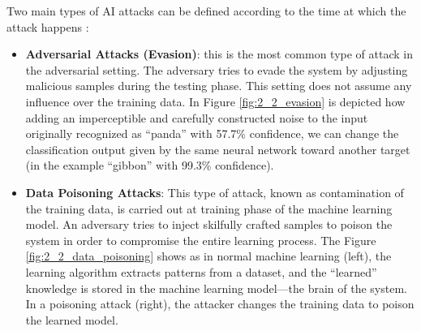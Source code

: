 Two main types of AI attacks can be defined according to the time at which the attack happens \cite{journals/corr/abs-1810-00069}:
\begin{itemize}
    \item \textbf{Adversarial Attacks (Evasion)}: this is the most common type of attack in
    the adversarial setting. The adversary tries to evade the system by adjusting malicious samples during the testing phase. This
    setting does not assume any influence over the training data.
    In Figure \ref{fig:2_2_evasion} is depicted how adding an imperceptible and carefully constructed noise to the input originally recognized as “panda” with 57.7\% confidence, we can change
    the classification output given by the same neural network toward another target (in the example “gibbon” with 99.3\% confidence).
    \item \textbf{Data Poisoning Attacks}: This type of attack, known as contamination of the training data, is carried out at training phase of
    the machine learning model. An adversary tries to inject
    skilfully crafted samples to poison the system in order to
    compromise the entire learning process. The Figure \ref{fig:2_2_data_poisoning} shows as in normal machine learning (left), the learning algorithm extracts
    patterns from a dataset, and the “learned” knowledge is stored in the machine
    learning model---the brain of the system. In a poisoning attack (right), the
    attacker changes the training data to poison the learned model. 
\end{itemize}

